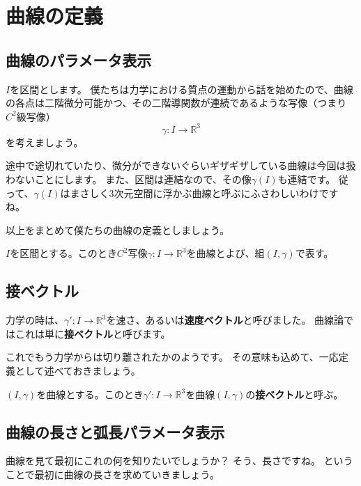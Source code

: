 \chapter{曲線の定義}

\section{曲線のパラメータ表示}

$I$を区間とします。
僕たちは力学における質点の運動から話を始めたので、曲線の各点は二階微分可能かつ、その二階導関数が連続であるような写像（つまり$C^2$級写像）
\[
  \gamma:I\to\mathbb{R}^3
\]
を考えましょう。

途中で途切れていたり、微分ができないぐらいギザギザしている曲線は今回は扱わないことにします。
また、区間は連結なので、その像$\gamma(I)$も連結です。
従って、$\gamma(I)$はまさしく3次元空間に浮かぶ曲線と呼ぶにふさわしいわけですね。

以上をまとめて僕たちの曲線の定義としましょう。
\begin{definition}
  $I$を区間とする。このとき$C^2$写像$\gamma:I\to\mathbb{R}^3$を曲線とよび、組$(I,\gamma)$で表す。
\end{definition}



\section{接ベクトル}

力学の時は、$\gamma':I\to\mathbb{R}^3$を速さ、あるいは\textbf{速度ベクトル}と呼びました。
曲線論ではこれは単に\textbf{接ベクトル}と呼びます。

これでもう力学からは切り離されたかのようです。
その意味も込めて、一応定義として述べておきましょう。
\begin{definition}
  $(I,\gamma)$を曲線とする。このとき$\gamma':I\to\mathbb{R}^3$を曲線$(I,\gamma)$の\textbf{接ベクトル}と呼ぶ。
\end{definition}



\section{曲線の長さと弧長パラメータ表示}

曲線を見て最初にこれの何を知りたいでしょうか？
そう、長さですね。
ということで最初に曲線の長さを求めていきましょう。

